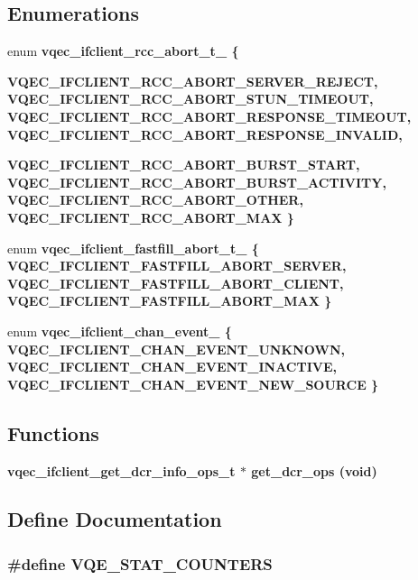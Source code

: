 \subsection*{Enumerations}
\begin{CompactItemize}
\item 
enum \bf{vqec\_\-ifclient\_\-rcc\_\-abort\_\-t\_\-} \{ \par
\bf{VQEC\_\-IFCLIENT\_\-RCC\_\-ABORT\_\-SERVER\_\-REJECT}, 
\bf{VQEC\_\-IFCLIENT\_\-RCC\_\-ABORT\_\-STUN\_\-TIMEOUT}, 
\bf{VQEC\_\-IFCLIENT\_\-RCC\_\-ABORT\_\-RESPONSE\_\-TIMEOUT}, 
\bf{VQEC\_\-IFCLIENT\_\-RCC\_\-ABORT\_\-RESPONSE\_\-INVALID}, 
\par
\bf{VQEC\_\-IFCLIENT\_\-RCC\_\-ABORT\_\-BURST\_\-START}, 
\bf{VQEC\_\-IFCLIENT\_\-RCC\_\-ABORT\_\-BURST\_\-ACTIVITY}, 
\bf{VQEC\_\-IFCLIENT\_\-RCC\_\-ABORT\_\-OTHER}, 
\bf{VQEC\_\-IFCLIENT\_\-RCC\_\-ABORT\_\-MAX}
 \}
\item 
enum \bf{vqec\_\-ifclient\_\-fastfill\_\-abort\_\-t\_\-} \{ \bf{VQEC\_\-IFCLIENT\_\-FASTFILL\_\-ABORT\_\-SERVER}, 
\bf{VQEC\_\-IFCLIENT\_\-FASTFILL\_\-ABORT\_\-CLIENT}, 
\bf{VQEC\_\-IFCLIENT\_\-FASTFILL\_\-ABORT\_\-MAX}
 \}
\item 
enum \bf{vqec\_\-ifclient\_\-chan\_\-event\_\-} \{ \bf{VQEC\_\-IFCLIENT\_\-CHAN\_\-EVENT\_\-UNKNOWN}, 
\bf{VQEC\_\-IFCLIENT\_\-CHAN\_\-EVENT\_\-INACTIVE}, 
\bf{VQEC\_\-IFCLIENT\_\-CHAN\_\-EVENT\_\-NEW\_\-SOURCE}
 \}
\end{CompactItemize}
\subsection*{Functions}
\begin{CompactItemize}
\item 
\bf{vqec\_\-ifclient\_\-get\_\-dcr\_\-info\_\-ops\_\-t} $\ast$ \bf{get\_\-dcr\_\-ops} (void)
\end{CompactItemize}


\subsection{Define Documentation}
\subsubsection{\setlength{\rightskip}{0pt plus 5cm}\#define VQE\_\-STAT\_\-COUNTERS}\label{group__structs_g32eb559d994fb28d2b194437bea80bc4}


